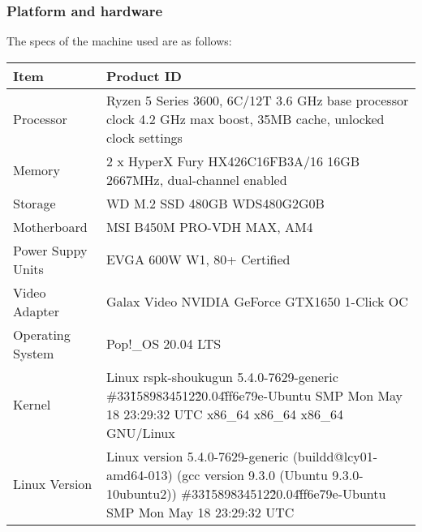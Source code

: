 \subsubsection{Platform and hardware}
The specs of the machine used are as follows:

\begin{tabularx}{\linewidth}{|l|X|}
    \hline
    Item & Product ID \\
    \hline
    Processor  & Ryzen 5 Series 3600, 6C/12T 3.6 GHz base processor clock 4.2 GHz max boost, 35MB cache, unlocked clock settings \\
    \hline
    Memory  & 2 x HyperX Fury HX426C16FB3A/16 16GB 2667MHz, dual-channel enabled\\
    \hline
    Storage  & WD M.2 SSD 480GB WDS480G2G0B \\
    \hline
    Motherboard  & MSI B450M PRO-VDH MAX, AM4 \\
    \hline
    Power Suppy Units  & EVGA 600W W1, 80+ Certified\\
    \hline
    Video Adapter  &  Galax Video NVIDIA GeForce GTX1650 1-Click OC  \\
    \hline
    Operating System  &  Pop!\_OS 20.04 LTS  \\
    \hline
    Kernel  &  Linux rspk-shoukugun 5.4.0-7629-generic \#33\~1589834512\~20.04\~ff6e79e-Ubuntu SMP Mon May 18 23:29:32 UTC  x86\_64 x86\_64 x86\_64 GNU/Linux\\
    \hline
    Linux Version  & Linux version 5.4.0-7629-generic (buildd@lcy01-amd64-013) (gcc version 9.3.0 (Ubuntu 9.3.0-10ubuntu2)) \#33\~1589834512\~20.04\~ff6e79e-Ubuntu SMP Mon May 18 23:29:32 UTC \\ 
    \hline
\end{tabularx}




